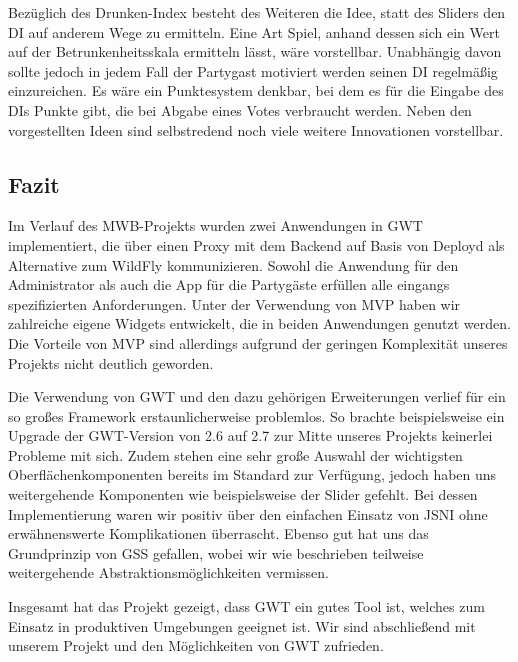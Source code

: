 Bezüglich des Drunken-Index besteht des Weiteren die Idee, statt des Sliders den DI auf anderem Wege zu ermitteln. Eine Art Spiel, anhand dessen sich ein Wert auf der Betrunkenheitsskala ermitteln lässt, wäre vorstellbar. Unabhängig davon sollte jedoch in jedem Fall der Partygast motiviert werden seinen DI regelmäßig einzureichen. Es wäre ein Punktesystem denkbar, bei dem es für die Eingabe des DIs Punkte gibt, die bei Abgabe eines Votes verbraucht werden. Neben den vorgestellten Ideen sind selbstredend noch viele weitere Innovationen vorstellbar.

\subsection{Fazit}
Im Verlauf des MWB-Projekts wurden zwei Anwendungen in GWT implementiert, die über einen Proxy mit dem Backend auf Basis von Deployd als Alternative zum WildFly kommunizieren. Sowohl die Anwendung für den Administrator als auch die App für die Partygäste erfüllen alle eingangs spezifizierten Anforderungen. Unter der Verwendung von MVP haben wir zahlreiche eigene Widgets entwickelt, die in beiden Anwendungen genutzt werden. Die Vorteile von MVP sind allerdings aufgrund der geringen Komplexität unseres Projekts nicht deutlich geworden. 

Die Verwendung von GWT und den dazu gehörigen Erweiterungen verlief für ein so großes Framework erstaunlicherweise problemlos.
So brachte beispielsweise ein Upgrade der GWT-Version von 2.6 auf 2.7 zur Mitte unseres Projekts keinerlei Probleme mit sich. Zudem stehen eine sehr große Auswahl der wichtigsten Oberflächenkomponenten bereits im Standard zur Verfügung, jedoch haben uns weitergehende Komponenten wie beispielsweise der Slider gefehlt. Bei dessen Implementierung waren wir positiv über den einfachen Einsatz von JSNI ohne erwähnenswerte Komplikationen überrascht. Ebenso gut hat uns das Grundprinzip von GSS gefallen, wobei wir wie beschrieben teilweise weitergehende Abstraktionsmöglichkeiten vermissen.

Insgesamt hat das Projekt gezeigt, dass GWT ein gutes Tool ist, welches zum Einsatz in produktiven Umgebungen geeignet ist. Wir sind abschließend mit unserem Projekt und den Möglichkeiten von GWT zufrieden.

